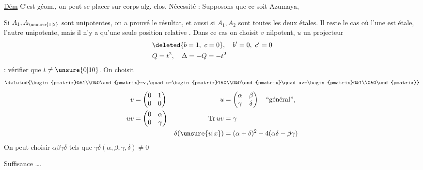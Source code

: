 \uline{Dém} C'est géom., on peut se placer sur corps alg. clos. Nécessité : Supposons que ce soit Azumaya,  

Si $A_1,A_{\unsure{1|2}}$ sont unipotentes, on a prouvé le résultat, et aussi si $A_1,A_2$ sont toutes les deux étales. Il reste le cas où l'une est étale, l'autre unipotente, mais il n'y a qu'une seule position relative . Dans ce cas on choisit $v$ nilpotent, $u$ un projecteur
\[
\begin{aligned}
&\deleted{b=1,\ c=0},\quad b'=0,\ c'=0\\
&Q=t^2,\quad\Delta=-Q=-t^2
\end{aligned}
\]
: vérifier que $t\ne\unsure{0|10}$. On choisit
\[
\deleted{\begin{pmatrix}0&1\\0&0\end{pmatrix}=v,\quad u=\begin{pmatrix}1&0\\0&0\end{pmatrix}\quad uv=\begin{pmatrix}0&1\\0&0\end{pmatrix}}
\]
\[
\begin{aligned}
v&=\begin{pmatrix}0&1\\0&0\end{pmatrix}&u&=\begin{pmatrix}\alpha&\beta\\\gamma&\delta\end{pmatrix}\quad\text{``général'',}\\
uv&=\begin{pmatrix}0&\alpha\\0&\gamma\end{pmatrix}&\operatorname{Tr}uv&=\gamma\\
&&\delta(\unsure{u|x})&=(\alpha+\delta)^2-4(\alpha\delta-\beta\gamma)
\end{aligned}
\]
On peut choisir $\alpha\beta\gamma\delta$ tels que $\gamma\delta(\alpha,\beta,\gamma,\delta)\ne0$

Suffisance  \ldots.
